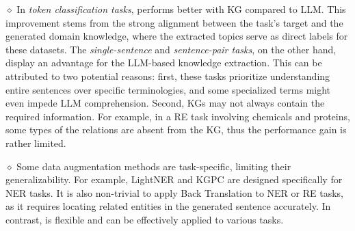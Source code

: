 \noindent $\diamond$ In \textit{token classification tasks}, {\ours} performs better with KG compared to LLM. This improvement stems from the strong alignment between the task's target and the generated domain knowledge, where the extracted topics serve as direct labels for these datasets. The \textit{single-sentence} and \textit{sentence-pair tasks}, on the other hand, display an advantage for the LLM-based knowledge extraction. This can be attributed to two potential reasons: first, these tasks prioritize understanding entire sentences over specific terminologies, and some specialized terms might even impede LLM comprehension. Second, KGs may not always contain the required information. For example, in a RE task involving chemicals and proteins, some types of the relations are absent from the KG, thus the performance gain is rather limited.

\noindent $\diamond$ Some data augmentation methods are task-specific, limiting their generalizability. For example, LightNER and KGPC are designed specifically for NER tasks. It is also non-trivial to apply Back Translation to NER or RE tasks, as it requires locating related entities in the generated sentence accurately.
In contrast, {\ours} is flexible and can be effectively applied to various tasks.







